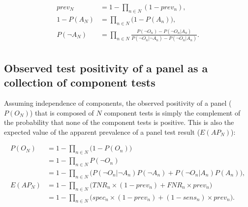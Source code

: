 \documentclass[a4paper, 12pt, twoside]{article}
\let\Oldsubsection\subsection
\renewcommand{\subsection}{\FloatBarrier\Oldsubsection}
\providecommand{\DIFaddbegin}{} %
\providecommand{\DIFaddend}{} %
\begin{document}
\begin{equation*}
\begin{aligned}
prev_N &= 1- \prod_{n \in N}{ (1-prev_n) }, \\
1-P(A_N) &= \prod_{n \in N}{\DIFaddbegin \big(\DIFaddend 1-P(A_n)\DIFaddbegin \big)\DIFaddend }, \\
P(\neg A_N) &= \prod_{n \in N}{\frac{P(\neg O_n) - P(\neg O_n|A_n)}{P(\neg O_n|\neg A_n) - P(\neg O_n|A_n)}}. \\
\end{aligned}
\end{equation*}
%
%

\subsection{Observed test positivity of a panel as a collection of component tests}

Assuming independence of components, the observed positivity of a panel (\(P(O_N)\)) that is composed of \(N\) component tests is simply the complement of the probability that none of the component tests is positive. This is also the expected value of the apparent prevalence of a panel test result (\(E(AP_N)\)):

\begin{equation*}
\begin{aligned}
P(O_N) &= 1-\prod_{n \in N}{\DIFaddbegin \big(\DIFaddend 1-P(O_n)\DIFaddbegin \big)\DIFaddend } \\
 &= 1-\prod_{n \in N}{P(\neg O_n)} \\
 &= 1-\prod_{n \in N}{ \bigg(P(\neg O_n|\neg A_n)P(\neg A_n) + P(\neg O_n|A_n)P(A_n)} \bigg), \\
E(AP_N) &= 1- \prod_{n \in N}{ \bigg(TNR_n \times (1-prev_n) + FNR_n \times prev_n} \bigg) \\
 &= 1- \prod_{n \in N}{ \bigg(spec_n \times (1-prev_n) + (1-sens_n) \times prev_n} \bigg). \\
\end{aligned}
\end{equation*}
\end{document}
